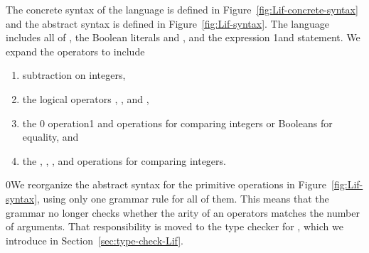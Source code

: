 \documentclass[7x10]{TimesAPriori_MIT}%
\def\racketEd{0}
\def\pythonEd{1}
\def\edition{1}
\newcommand{\racket}[1]{{\if\edition\racketEd{#1}\fi}}
\newcommand{\python}[1]{{\if\edition\pythonEd #1\fi}}
\begin{document}
The concrete syntax of the \LangIf{} language is defined in
Figure~\ref{fig:Lif-concrete-syntax} and the abstract syntax is defined
in Figure~\ref{fig:Lif-syntax}. The \LangIf{} language includes all of
\LangVar{}\racket{(shown in gray)}, the Boolean literals \TRUE{} and
\FALSE{}, and the  expression \python{and statement}. We expand the
operators to include
\begin{enumerate}
\item subtraction on integers,
\item the logical operators , , and ,
\item the \racket{ operation}\python{\key{==} and \key{!=} operations}
  for comparing integers or Booleans for equality, and
\item the \key{<}, \key{<=}, \key{>}, and \key{>=} operations for
  comparing integers.
\end{enumerate}

\racket{We reorganize the abstract syntax for the primitive
  operations in Figure~\ref{fig:Lif-syntax}, using only one grammar
  rule for all of them. This means that the grammar no longer checks
  whether the arity of an operators matches the number of
  arguments. That responsibility is moved to the type checker for
  \LangIf{}, which we introduce in Section~\ref{sec:type-check-Lif}.}


\newcommand{\LifGrammarRacket}{
  \begin{array}{lcl}
   \Type &::=& \key{Boolean} \\
    \itm{bool} &::=& \TRUE \MID \FALSE \\  
    \itm{cmp} &::= & \key{eq?} \MID \key{<} \MID \key{<=} \MID \key{>} \MID \key{>=} \\
    \Exp &::=& \CSUB{\Exp}{\Exp} \MID \itm{bool}
        \MID (\key{and}\;\Exp\;\Exp) \MID (\key{or}\;\Exp\;\Exp)
        \MID (\key{not}\;\Exp) \\
        &\MID& (\itm{cmp}\;\Exp\;\Exp) \MID \CIF{\Exp}{\Exp}{\Exp} 
  \end{array}
}
\newcommand{\LifASTRacket}{
\begin{array}{lcl}
   \Type &::=& \key{Boolean} \\
  \itm{bool} &::=& \code{\#t} \MID \code{\#f} \\
  \itm{cmp} &::= & \code{eq?} \MID \code{<} \MID \code{<=} \MID \code{>} \MID \code{>=} \\
  \itm{op} &::= & \itm{cmp} \MID \code{and} \MID \code{or} \MID \code{not} \\
  \Exp &::=& \BOOL{\itm{bool}} \MID \IF{\Exp}{\Exp}{\Exp} 
\end{array}
}
\newcommand{\LintOpAST}{
  \begin{array}{rcl}
    \itm{op} &::= & \code{read} \MID \code{+} \MID \code{-}\\
    \Exp{} &::=& \INT{\Int} \MID \PRIM{\itm{op}}{\Exp\ldots}    
  \end{array}
}
\end{document}
